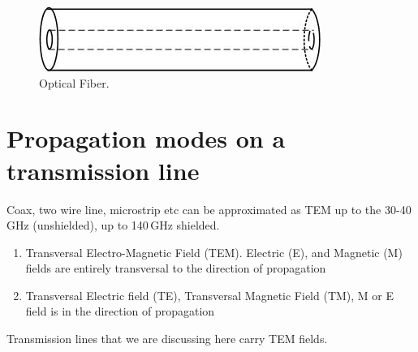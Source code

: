 \documentclass{ximera}
\begin{document}
\begin{figure}[ht!]
\begin{center}
\includegraphics[scale=0.4]{../jpg/fiber.jpg}
\caption{\label{fig:qm/OF} Optical Fiber.}
\end{center}
\end{figure}


\section{Propagation modes on a transmission line}

Coax, two wire line, microstrip etc can be approximated as TEM up to
the 30-40\,GHz (unshielded), up to 140\,GHz shielded.




\begin{enumerate}
\item Transversal Electro-Magnetic Field (TEM). Electric (E), and Magnetic (M) fields are entirely transversal to the direction of
propagation
\item Transversal Electric field (TE), Transversal Magnetic Field (TM),  M or E field is in the direction of propagation
\end{enumerate}

Transmission lines that we are discussing  here carry TEM fields.

\end{document}
